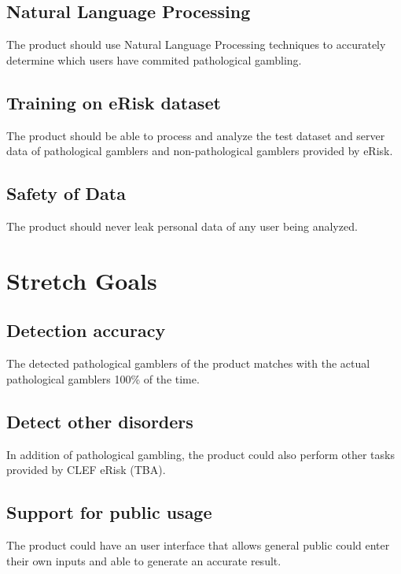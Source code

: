 \documentclass{article}
\begin{document}
\subsection{Natural Language Processing}
The product should use Natural Language Processing techniques to accurately determine which users have commited pathological gambling.

\subsection{Training on eRisk dataset}
The product should be able to process and analyze the test dataset and server data of pathological gamblers and non-pathological gamblers provided by eRisk.

\subsection{Safety of Data}
The product should never leak personal data of any user being analyzed.

\section{Stretch Goals}

\subsection{Detection accuracy}
The detected pathological gamblers of the product matches with the actual pathological gamblers 100\% of the time.

\subsection{Detect other disorders}
In addition of pathological gambling, the product could also perform other tasks provided by CLEF eRisk (TBA).

\subsection{Support for public usage}
The product could have an user interface that allows general public could enter their own inputs and able to generate an accurate result.
\end{document}
